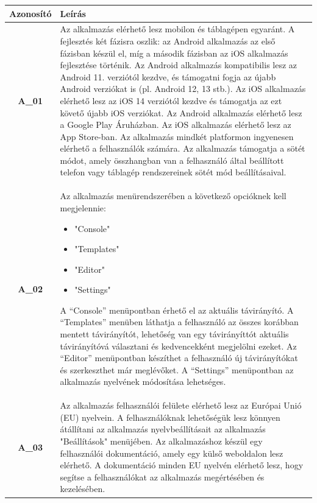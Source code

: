 \documentclass{article}
\begin{document}
\begingroup
\centering
\begin{longtable}{|c|p{14cm}|}
\hline
\textbf{Azonosító} & \textbf{Leírás}        \\ 
\hline
       \textbf{A\_01}  & Az alkalmazás elérhető lesz mobilon és táblagépen egyaránt. A fejlesztés két fázisra oszlik: az Android alkalmazás az első fázisban készül el, míg a második fázisban az iOS alkalmazás fejlesztése történik.
       Az Android alkalmazás kompatibilis lesz az Android 11. verziótól kezdve, és támogatni fogja az újabb Android verziókat is (pl. Android 12, 13 stb.). Az iOS alkalmazás elérhető lesz az iOS 14 verziótól kezdve és támogatja az ezt követő újabb iOS verziókat.
       Az Android alkalmazás elérhető lesz a Google Play Áruházban. Az iOS alkalmazás elérhető lesz az App Store-ban. Az alkalmazás mindkét platformon ingyenesen elérhető a felhasználók számára.
       Az alkalmazás támogatja a sötét módot, amely összhangban van a felhasználó által beállított telefon vagy táblagép rendszereinek sötét mód beállításaival. \\\hline
       
       \textbf{A\_02}  & Az alkalmazás menürendszerében a következő opcióknek kell megjelennie:
       \begin{itemize}
       \item "Console"
       \item "Templates"
       \item "Editor"
       \item "Settings"
       \end{itemize}
       A “Console” menüpontban érhető el az aktuális távirányító. A “Templates” menüben láthatja a felhasználó az összes korábban mentett távirányítót, lehetőség van egy távirányíttót aktuális távirányítóvá választani és kedvencekként megjelölni ezeket. Az “Editor” menüpontban készíthet a felhasználó új távirányítókat és  szerkeszthet már meglévőket. A “Settings” menüpontban az alkalmazás nyelvének módosítása lehetséges. \\\hline
       
       \textbf{A\_03}  & Az alkalmazás felhasználói felülete elérhető lesz az Európai Unió (EU) nyelvein. A felhasználóknak lehetőségük lesz könnyen átállítani az alkalmazás nyelvbeállításait az alkalmazás "Beállítások" menüjében. Az alkalmazáshoz készül egy felhasználói dokumentáció, amely egy külső weboldalon lesz elérhető. A dokumentáció minden EU nyelvén elérhető lesz, hogy segítse a felhasználókat az alkalmazás megértésében és kezelésében.  \\\hline
       

\end{longtable}
\end{document}
